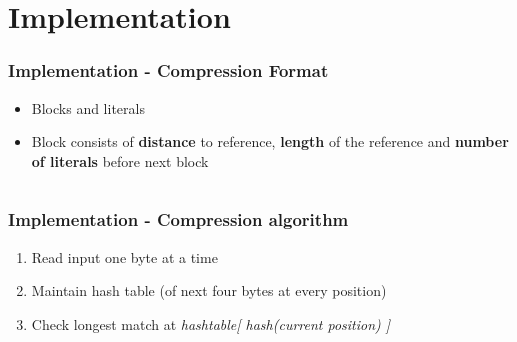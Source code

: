 \documentclass{beamer}
\begin{document}

\section{Implementation} 

\begin{frame}
	\frametitle{Implementation - Compression Format}
	
	\begin{itemize}
		\item Blocks and literals  
		\item Block consists of \textbf{distance} to reference, \textbf{length} of the reference and \textbf{number of literals} before next block
	\end{itemize}
	\inputminted[firstline=49, lastline=54, bgcolor=lightgray, breaklines]{c}{wflz/wfLZ.c}	
	
\end{frame}

\begin{frame}
	\frametitle{Implementation - Compression algorithm}
	
	\begin{enumerate}
		\item Read input one byte at a time
		\item Maintain hash table (of next four bytes at every position)
		\item Check longest match at \textit{hashtable[ hash(current position) ]}	 
	\end{enumerate}
	


\end{frame}
\end{document}
